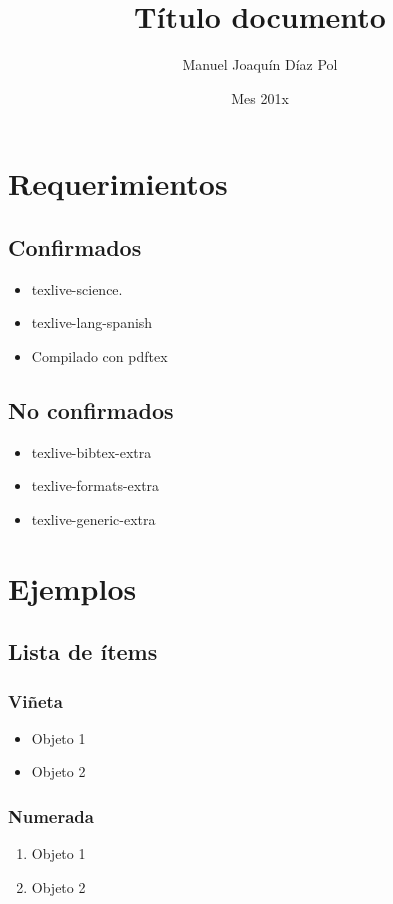 \documentclass[11pt,spanish]{report}
\title{\textbf{Título documento}}
\author{Manuel Joaquín Díaz Pol}
\date{Mes 201x}
\begin{document}
	\maketitle

	\tableofcontents 

	\chapter{Requerimientos}
		\section{Confirmados}
			\begin{itemize}
				\item texlive-science.
				\item texlive-lang-spanish
				\item Compilado con pdftex
			\end{itemize}
		
		\section{No confirmados}
			\begin{itemize}
				\item texlive-bibtex-extra
				\item texlive-formats-extra
				\item texlive-generic-extra
			\end{itemize}
			
	\chapter{Ejemplos}
		\section{Lista de ítems}
			\subsection{Viñeta}
				\begin{itemize}
					\item Objeto 1
					\item Objeto 2
				\end{itemize}
				
			\subsection{Numerada}
				\begin{enumerate}
					\item Objeto 1 
					\item Objeto 2	
				\end{enumerate}			
			
\end{document}
